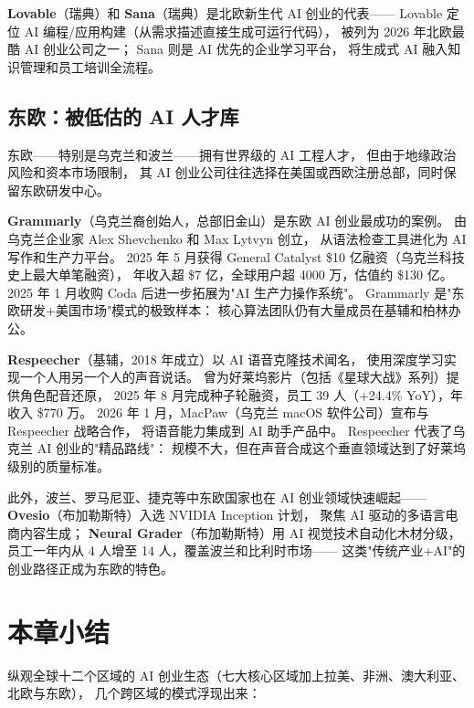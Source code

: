 \textbf{Lovable}（瑞典）和 \textbf{Sana}（瑞典）是北欧新生代 AI 创业的代表——
Lovable 定位 AI 编程/应用构建（从需求描述直接生成可运行代码），
被列为 2026 年北欧最酷 AI 创业公司之一；
Sana 则是 AI 优先的企业学习平台，
将生成式 AI 融入知识管理和员工培训全流程。

\subsection{东欧：被低估的 AI 人才库}

东欧——特别是乌克兰和波兰——拥有世界级的 AI 工程人才，
但由于地缘政治风险和资本市场限制，
其 AI 创业公司往往选择在美国或西欧注册总部，同时保留东欧研发中心。

\textbf{Grammarly}（乌克兰裔创始人，总部旧金山）是东欧 AI 创业最成功的案例。
由乌克兰企业家 Alex Shevchenko 和 Max Lytvyn 创立，
从语法检查工具进化为 AI 写作和生产力平台。
2025 年 5 月获得 General Catalyst \$10 亿融资（乌克兰科技史上最大单笔融资），
年收入超 \$7 亿，全球用户超 4000 万，估值约 \$130 亿。
2025 年 1 月收购 Coda 后进一步拓展为"AI 生产力操作系统"。
Grammarly 是"东欧研发+美国市场"模式的极致样本：
核心算法团队仍有大量成员在基辅和柏林办公。

\textbf{Respeecher}（基辅，2018 年成立）以 AI 语音克隆技术闻名，
使用深度学习实现一个人用另一个人的声音说话。
曾为好莱坞影片（包括《星球大战》系列）提供角色配音还原，
2025 年 8 月完成种子轮融资，员工 39 人（+24.4\% YoY），年收入 \$770 万。
2026 年 1 月，MacPaw（乌克兰 macOS 软件公司）宣布与 Respeecher 战略合作，
将语音能力集成到 AI 助手产品中。
Respeecher 代表了乌克兰 AI 创业的"精品路线"：
规模不大，但在声音合成这个垂直领域达到了好莱坞级别的质量标准。

此外，波兰、罗马尼亚、捷克等中东欧国家也在 AI 创业领域快速崛起——
\textbf{Ovesio}（布加勒斯特）入选 NVIDIA Inception 计划，
聚焦 AI 驱动的多语言电商内容生成；
\textbf{Neural Grader}（布加勒斯特）用 AI 视觉技术自动化木材分级，
员工一年内从 4 人增至 14 人，覆盖波兰和比利时市场——
这类"传统产业+AI"的创业路径正成为东欧的特色。


\section*{本章小结}

纵观全球十二个区域的 AI 创业生态（七大核心区域加上拉美、非洲、澳大利亚、北欧与东欧），
几个跨区域的模式浮现出来：

